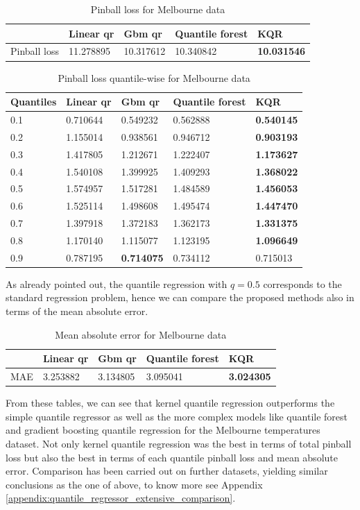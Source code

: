\begin{table}[!htp]
\caption{Pinball loss for Melbourne data}
\begin{tabular}{lllll}
    \toprule
     & Linear qr & Gbm qr & Quantile forest & KQR \\
    \midrule
    Pinball loss & 11.278895 & 10.317612 & 10.340842 & \textbf{10.031546} \\
    \bottomrule
    \end{tabular}
\end{table}

\begin{table}[!htp]
    \caption{Pinball loss quantile-wise for Melbourne data}
    \begin{tabular}{lllll}
    \toprule
    Quantiles & Linear qr & Gbm qr & Quantile forest & KQR \\
    \midrule
    0.1 & 0.710644 & 0.549232 & 0.562888 & \textbf{0.540145} \\
    0.2 & 1.155014 & 0.938561 & 0.946712 & \textbf{0.903193} \\
    0.3 & 1.417805 & 1.212671 & 1.222407 & \textbf{1.173627} \\
    0.4 & 1.540108 & 1.399925 & 1.409293 & \textbf{1.368022} \\
    0.5 & 1.574957 & 1.517281 & 1.484589 & \textbf{1.456053} \\
    0.6 & 1.525114 & 1.498608 & 1.495474 & \textbf{1.447470} \\
    0.7 & 1.397918 & 1.372183 & 1.362173 & \textbf{1.331375} \\
    0.8 & 1.170140 & 1.115077 & 1.123195 & \textbf{1.096649} \\
    0.9 & 0.787195 & \textbf{0.714075} & 0.734112 & 0.715013 \\
    \bottomrule
    \end{tabular}
\end{table}
As already pointed out, the quantile regression with $q=0.5$ corresponds to the standard regression problem, hence we can compare the proposed methods also in terms of the mean absolute error.
\begin{table}[!htp]
\caption{Mean absolute error for Melbourne data}
\begin{tabular}{lllll}
    \toprule
     & Linear qr & Gbm qr & Quantile forest & KQR \\
    \midrule
    MAE & 3.253882 & 3.134805 & 3.095041 & \textbf{3.024305} \\
    \bottomrule
    \end{tabular}
\end{table}  
From these tables, we can see that kernel quantile regression outperforms the simple quantile regressor as well as the more complex models like quantile forest and gradient boosting quantile regression for the Melbourne temperatures dataset. Not only kernel quantile regression was the best in terms of total pinball loss but also the best in terms of each quantile pinball loss and mean absolute error.
Comparison has been carried out on further datasets, yielding similar conclusions as the one of above, to know more see Appendix \ref{appendix:quantile_regressor_extensive_comparison}.


